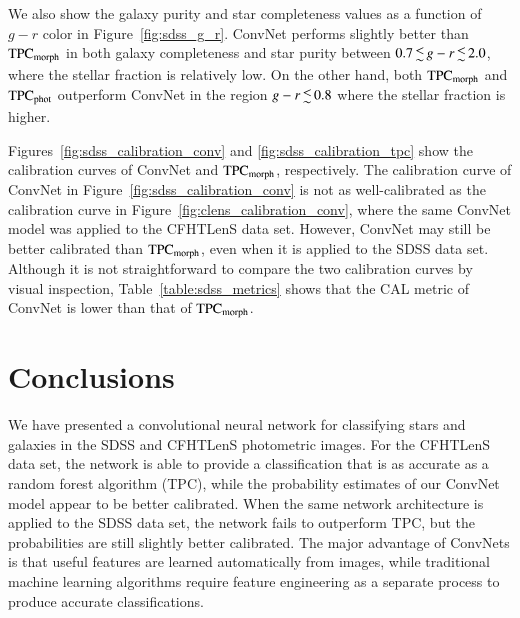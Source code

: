 \documentclass[fleqn,usenatbib]{mnras}
\begin{document}
We also show the galaxy purity and star completeness values as a function of
$g-r$ color in Figure~\ref{fig:sdss_g_r}.
ConvNet performs slightly better than ${\mathrm{TPC}}_{{\mathrm{morph}}}$ in both
galaxy completeness and star purity between $0.7 \la g-r \la 2.0$,
where the stellar fraction is relatively low.
On the other hand, both ${\mathrm{TPC}}_{{\mathrm{morph}}}$ and ${\mathrm{TPC}}_{{\mathrm{phot}}}$ outperform
ConvNet in the region $g-r \la 0.8$ where the stellar fraction is higher.

Figures~\ref{fig:sdss_calibration_conv} and \ref{fig:sdss_calibration_tpc}
show the calibration curves of ConvNet and ${\mathrm{TPC}}_{{\mathrm{morph}}}$,
respectively.
The calibration curve of ConvNet in Figure~\ref{fig:sdss_calibration_conv}
is not as well-calibrated as the calibration curve in
Figure~\ref{fig:clens_calibration_conv},
where the same ConvNet model was applied to the CFHTLenS data set.
However, ConvNet may still be better calibrated than ${\mathrm{TPC}}_{{\mathrm{morph}}}$,
even when it is applied to the SDSS data set.
Although it is not straightforward to compare the two calibration curves by
visual inspection, Table~\ref{table:sdss_metrics} shows that the CAL metric of
ConvNet is lower than that of ${\mathrm{TPC}}_{{\mathrm{morph}}}$.



\section{Conclusions}
  \label{sec:conclusions}

We have presented a convolutional neural network for classifying stars and
galaxies in the SDSS and CFHTLenS photometric images.
For the CFHTLenS data set, the network is able to provide a classification that
is as accurate as a random forest algorithm (TPC), while the probability estimates of
our ConvNet model appear to be better calibrated.
When the same network architecture is applied to the SDSS data set,
the network fails to outperform TPC,
but the probabilities are still slightly better calibrated.
The major advantage of ConvNets is that useful features are learned
automatically from images, while traditional machine learning
algorithms require feature engineering as a separate process
to produce accurate classifications.
\end{document}
